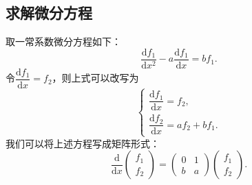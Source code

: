\subsection{求解微分方程}

取一常系数微分方程如下：
\[\dfrac{\mathrm{d}f_1}{\mathrm{d}x^2}-a\dfrac{\mathrm{d}f_1}{\mathrm{d}x}=bf_1.\]
令$\dfrac{\mathrm{d}f_1}{\mathrm{d}x}=f_2$，则上式可以改写为
\[\begin{cases}
    \dfrac{\mathrm{d}f_1}{\mathrm{d}x}=f_2, \\
    \dfrac{\mathrm{d}f_2}{\mathrm{d}x}=af_2+bf_1.
\end{cases}\]
我们可以将上述方程写成矩阵形式：
\[\dfrac{\mathrm{d}}{\mathrm{d}x}\begin{pmatrix}
    f_1 \\ f_2
\end{pmatrix}=\begin{pmatrix}
    0 & 1 \\ b & a
\end{pmatrix}\begin{pmatrix}
    f_1 \\ f_2
\end{pmatrix}.\]

